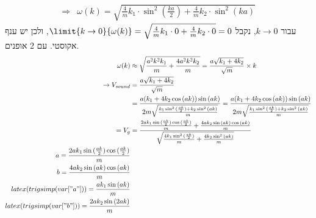 \documentclass{article}
\begin{document}
\begin{Question}
\begin{align*}
    \Rightarrow &\boxed{\omega(k)=\sqrt{
        \frac{4}{m}k_{1}\cdot 
        \sin^{2}\left( \frac{ka}{2} \right)
    +
        \frac{4}{m}k_{2}\cdot 
        \sin^{2}\left( ka \right)
    }}
\end{align*}
עבור $k\to0$, נקבל $\limit{k\to 0}{\omega(k)}=\sqrt{\frac{4}{m}k_{1}\cdot 0+\frac{4}{m}k_{2}\cdot 0}=0$, ולכן יש ענף אקוסטי. עם 2 אופנים.
\begin{align*}
    \omega(k)&\approx\sqrt{\frac{a^{2} k^{2} k_{1}}{m} + \frac{4 a^{2} k^{2} k_{2}}{m}}=\frac{a \sqrt{k_{1} + 4 k_{2}}}{\sqrt{m}}\times k\\\rightarrow  V_{sound}&=\frac{a \sqrt{k_{1} + 4 k_{2}}}{\sqrt{m}}\\
    &=\frac{a (k_{1} + 4 k_{2} \cos{(a k)}) \sin{(a k)}}{2 m \sqrt{\frac{k_{1} \sin^{2}{(\frac{a k}{2})} + k_{2} \sin^{2}{(a k)}}{m}}} = \frac{a (k_{1} + 4 k_{2} \cos{(a k)}) \sin{(a k)}}{2 m \sqrt{\frac{k_{1} \sin^{2}{(\frac{a k}{2})} + k_{2} \sin^{2}{(a k)}}{m}}} \\ = 
    V_{g}&=\frac{\frac{2 a k_{1} \sin{(\frac{a k}{2})} \cos{(\frac{a k}{2})}}{m} + \frac{4 a k_{2} \sin{(a k)} \cos{(a k)}}{m}}{\sqrt{\frac{4 k_{1} \sin^{2}{(\frac{a k}{2})}}{m} + \frac{4 k_{2} \sin^{2}{(a k)}}{m}}}\\
    a=\frac{2 a k_{1} \sin{(\frac{a k}{2})} \cos{(\frac{a k}{2})}}{m}\\
    b=\frac{4 a k_{2} \sin{(a k)} \cos{(a k)}}{m}\\
    latex(trigsimp(var["a"])) = \frac{a k_{1} \sin{(a k)}}{m}\\
    latex(trigsimp(var["b"])) = \frac{2 a k_{2} \sin{(2 a k)}}{m}
\end{align*}




\end{Question}
\end{document}

